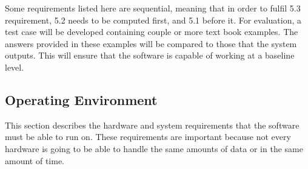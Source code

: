             Some requirements listed here are sequential, meaning that in order to fulfil 5.3 requirement, 5.2 needs to be computed first, and 5.1 before it. For evaluation, a test case will be developed containing couple or more text book examples. The answers provided in these examples will be compared to those that the system outputs. This will ensure that the software is capable of working at a baseline level.
        
    \subsection{Operating Environment}
        This section describes the hardware and system requirements that the software must be able to run on. These requirements are important because not every hardware is going to be able to handle the same amounts of data or in the same amount of time.
        
